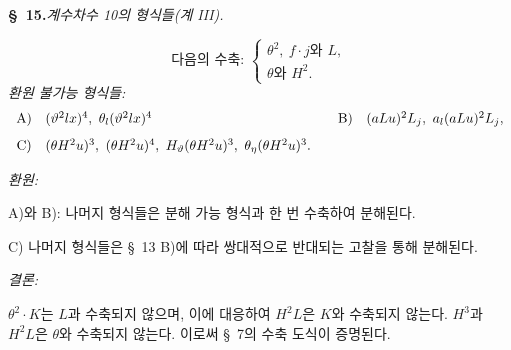 
\begin{center}
\textbf{\S\ 15.}\quad\emph{계수차수 10의 형식들(계 III).}
\end{center}
\[
\text{다음의 수축: }\left\{\begin{array}{l}
\theta^2,
\ f\cdot j\text{와 }L,\\
\theta\text{와 }H^2.
\end{array}\right.
\]
\noindent\emph{환원 불가능 형식들:}
\[
\begin{array}{c@{\quad}l@{\qquad}c@{\quad}l}
\text{A)}&(\vartheta^2lx)^4,
\ \theta_l(\vartheta^2lx)^4&
\text{B)}&(aLu)^2L_j,
\ a_l(aLu)^2L_j,\\[0.8em]
\text{C)}&(\theta H^2u)^3,
\ (\theta H^2u)^4,
\ H_\vartheta(\theta H^2u)^3,
\ \theta_\eta(\theta H^2u)^3.
\end{array}
\]

\noindent\emph{환원:}

A)와 B): 나머지 형식들은 분해 가능 형식과 한 번 수축하여 분해된다.

C) 나머지 형식들은 \S\ 13 B)에 따라 쌍대적으로 반대되는 고찰을 통해 분해된다.

\noindent\emph{결론:}

$\theta^2\cdot K$는 $L$과 수축되지 않으며, 이에 대응하여 $H^2L$은 $K$와 수축되지 않는다. $H^3$과 $H^2L$은 $\theta$와 수축되지 않는다. 이로써 \S\ 7의 수축 도식이 증명된다.
